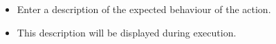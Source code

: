 
\begin{itemize}
\item Enter a description of the expected behaviour of the action.
\item This description will be displayed during execution.
\end{itemize}
